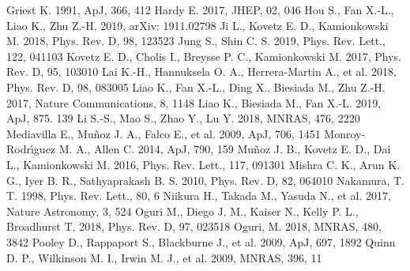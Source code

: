 \documentclass[useAMS,usenatbib,usegraphicx]{mn2e}
\begin{document}
\begin{thebibliography}{}
 Griest K. 1991, ApJ, 366, 412
 Hardy E. 2017, JHEP, 02, 046
 Hou S., Fan X.-L., Liao K., Zhu Z.-H. 2019, arXiv: 1911.02798
 Ji L., Kovetz E. D., Kamionkowski M. 2018, Phys. Rev. D, 98, 123523
 Jung S., Shin C. S. 2019, Phys. Rev. Lett., 122, 041103
Kovetz E. D., Cholis I., Breysse P. C.,  Kamionkowski M. 2017, Phys. Rev. D, 95, 103010
 Lai K.-H., Hannuksela O. A., Herrera-Martin A.,  et al. 2018, Phys. Rev. D, 98, 083005
 Liao K., Fan X.-L., Ding X., Biesiada M., Zhu Z.-H. 2017, Nature Communications, 8, 1148
 Liao K., Biesiada M., Fan X.-L. 2019, ApJ, 875. 139
 Li S.-S., Mao S., Zhao Y., Lu Y. 2018, MNRAS, 476, 2220
 Mediavilla E., Mu\~{n}oz J. A., Falco E., et al. 2009, ApJ, 706, 1451
 Monroy-Rodr\'{\i}guez M. A., Allen C. 2014, ApJ, 790, 159
 Mu\~{n}oz J. B., Kovetz E. D., Dai L., Kamionkowski M. 2016, Phys. Rev. Lett., 117, 091301
 Mishra C. K., Arun K. G., Iyer B. R., Sathyaprakash B. S. 2010, Phys. Rev. D, 82, 064010
 Nakamura, T. T. 1998, Phys. Rev. Lett., 80, 6
 Niikura H., Takada M., Yasuda N.,  et al. 2017, Nature Astronomy, 3, 524
 Oguri M., Diego J. M., Kaiser N., Kelly P. L., Broadhurst T. 2018, Phys. Rev. D, 97, 023518
 Oguri, M. 2018, MNRAS, 480, 3842
 Pooley D., Rappaport S., Blackburne J., et al. 2009, ApJ, 697, 1892
 Quinn D. P., Wilkinson M. I., Irwin M. J.,  et al. 2009, MNRAS, 396, 11

\end{thebibliography}
\end{document}
